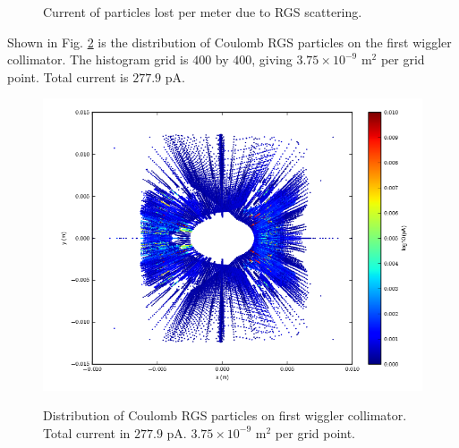 \documentclass[a4paper,10pt]{article}
\begin{document}
\begin{figure}
\caption{Current of particles lost per meter due to RGS scattering.}
\label{gen} %
\end{figure}

Shown in Fig. \ref{col:coul} is the distribution of Coulomb RGS particles on the first wiggler collimator.  The histogram grid is $400$ by $400$, giving $3.75 \times 10^{-9}$ m$^2$ per grid point.  Total current is $277.9$ pA.

\begin{figure}[h]
  \centering
  \includegraphics[width=16cm]{coll_dist.png}\\
  \caption{Distribution of Coulomb RGS particles on first wiggler collimator.  Total current in $277.9$ pA. $3.75 \times 10^{-9}$ m$^2$ per grid point.}
  \label{col:coul}
\end{figure}
\end{document}
